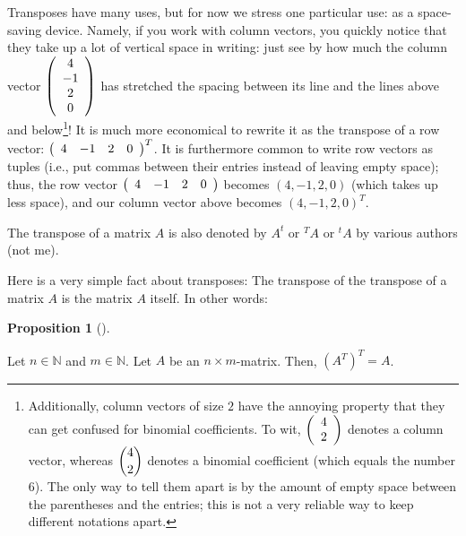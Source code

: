 \documentclass[numbers=enddot,12pt,final,onecolumn,notitlepage]{scrartcl}%
\theoremstyle{definition}
\newtheorem{prop}[theo]{Proposition}
\newenvironment{proposition}[1][]
{\begin{prop}[#1]\begin{leftbar}}
{\end{leftbar}\end{prop}}
\begin{document}
Transposes have many uses, but for now we stress one particular use: as a
space-saving device. Namely, if you work with column vectors, you quickly
notice that they take up a lot of vertical space in writing: just see by how
much the column vector $\left(
\begin{array}
[c]{c}%
4\\
-1\\
2\\
0
\end{array}
\right)  $ has stretched the spacing between its line and the lines above and
below\footnote{Additionally, column vectors of size $2$ have the annoying
property that they can get confused for binomial coefficients. To wit,
$\left(
\begin{array}
[c]{c}%
4\\
2
\end{array}
\right)  $ denotes a column vector, whereas $\dbinom{4}{2}$ denotes a binomial
coefficient (which equals the number $6$). The only way to tell them apart is
by the amount of empty space between the parentheses and the entries; this is
not a very reliable way to keep different notations apart.}! It is much more
economical to rewrite it as the transpose of a row vector: $\left(
\begin{array}
[c]{cccc}%
4 & -1 & 2 & 0
\end{array}
\right)  ^{T}$. It is furthermore common to write row vectors as tuples (i.e.,
put commas between their entries instead of leaving empty space); thus, the
row vector $\left(
\begin{array}
[c]{cccc}%
4 & -1 & 2 & 0
\end{array}
\right)  $ becomes $\left(  4,-1,2,0\right)  $ (which takes up less space),
and our column vector above becomes $\left(  4,-1,2,0\right)  ^{T}$.

The transpose of a matrix $A$ is also denoted by $A^{t}$ or $^{T}A$ or $^{t}A$
by various authors (not me).

Here is a very simple fact about transposes: The transpose of the transpose of
a matrix $A$ is the matrix $A$ itself. In other words:

\begin{proposition}
\label{prop.transpose.invol}Let $n\in\mathbb{N}$ and $m\in\mathbb{N}$. Let $A$
be an $n\times m$-matrix. Then, $\left(  A^{T}\right)  ^{T}=A$.
\end{proposition}
\end{document}
